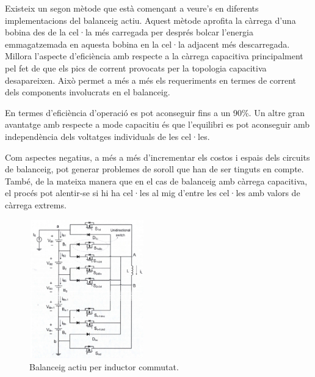 Existeix un segon mètode que està començant a veure's en diferents implementacions del balanceig actiu. Aquest mètode aprofita la càrrega d'una bobina des de la cel·la més carregada per després bolcar l'energia emmagatzemada en aquesta bobina en la cel·la adjacent més descarregada. Millora l'aspecte d'eficiència amb respecte a la càrrega capacitiva principalment pel fet de que els pics de corrent provocats per la topologia capacitiva desapareixen. Això permet a més a més els requeriments en termes de corrent dels components involucrats en el balanceig.

En termes d'eficiència d'operació es pot aconseguir fins a un 90\%. Un altre gran avantatge amb respecte a mode capacitiu és que l'equilibri es pot aconseguir amb independència dels voltatges individuals de les cel·les.

Com aspectes negatius, a més a més d'incrementar els costos i espais dels circuits de balanceig, pot generar problemes de soroll que han de ser tinguts en compte. També, de la mateixa manera que en el cas de balanceig amb càrrega capacitiva, el procés pot alentir-se si hi ha cel·les al mig d'entre les cel·les amb valors de càrrega extrems.

\begin{figure}[H]
	\centering
    \includegraphics[width=5cm, height=6cm] {BMS/balanceoactivoinductor.png}
    \caption{Balanceig actiu per inductor commutat.}
\end{figure}    

